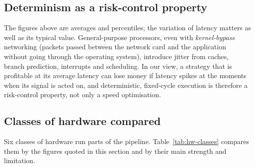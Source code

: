 \subsection{Determinism as a risk-control property}

The figures above are averages and percentiles; the variation of latency matters as well as its typical value.
General-purpose processors, even with \emph{kernel-bypass} networking (packets passed between the network card and
the application without going through the operating system), introduce jitter from caches, branch prediction,
interrupts and scheduling. In our view, a strategy that is profitable at its average latency
can lose money if latency spikes at the moments when its signal is acted on, and
deterministic, fixed-cycle execution is therefore a risk-control property, not only a speed
optimisation.

\subsection{Classes of hardware compared}
\label{sec:hw-landscape}
\label{sec:hw-classes}

Six classes of hardware run parts of the pipeline. Table~\ref{tab:hw-classes} compares them by the figures quoted in
this section and by their main strength and limitation.

